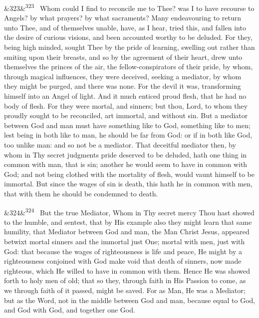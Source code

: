 \documentclass[12pt]{article}
\newcommand{\para}[1][]{\par\noindent\ifx&#1&\else\textsuperscript{\footnotesize #1}~\fi}
\begin{document}
\para[323] Whom could I find to reconcile me to Thee? was I to have recourse to Angels? by what prayers? by what sacraments? Many endeavouring to return unto Thee, and of themselves unable, have, as I hear, tried this, and fallen into the desire of curious visions, and been accounted worthy to be deluded. For they, being high minded, sought Thee by the pride of learning, swelling out rather than smiting upon their breasts, and so by the agreement of their heart, drew unto themselves the princes of the air, the fellow-conspirators of their pride, by whom, through magical influences, they were deceived, seeking a mediator, by whom they might be purged, and there was none. For the devil it was, transforming himself into an Angel of light. And it much enticed proud flesh, that he had no body of flesh. For they were mortal, and sinners; but thou, Lord, to whom they proudly sought to be reconciled, art immortal, and without sin. But a mediator between God and man must have something like to God, something like to men; lest being in both like to man, he should be far from God: or if in both like God, too unlike man: and so not be a mediator. That deceitful mediator then, by whom in Thy secret judgments pride deserved to be deluded, hath one thing in common with man, that is sin; another he would seem to have in common with God; and not being clothed with the mortality of flesh, would vaunt himself to be immortal. But since the wages of sin is death, this hath he in common with men, that with them he should be condemned to death.

\para[324] But the true Mediator, Whom in Thy secret mercy Thou hast showed to the humble, and sentest, that by His example also they might learn that same humility, that Mediator between God and man, the Man Christ Jesus, appeared betwixt mortal sinners and the immortal just One; mortal with men, just with God: that because the wages of righteousness is life and peace, He might by a righteousness conjoined with God make void that death of sinners, now made righteous, which He willed to have in common with them. Hence He was showed forth to holy men of old; that so they, through faith in His Passion to come, as we through faith of it passed, might be saved. For as Man, He was a Mediator; but as the Word, not in the middle between God and man, because equal to God, and God with God, and together one God.
\end{document}
